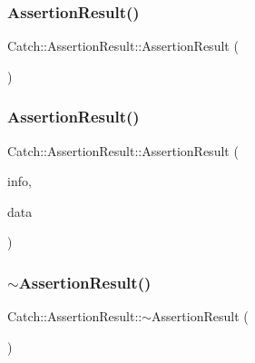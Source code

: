 \subsubsection{\texorpdfstring{Assertion\+Result()}{AssertionResult()}\hspace{0.1cm}{\footnotesize\ttfamily [1/2]}}
{\footnotesize\ttfamily Catch\+::\+Assertion\+Result\+::\+Assertion\+Result (\begin{DoxyParamCaption}{ }\end{DoxyParamCaption})}

\mbox{\label{class_catch_1_1_assertion_result_ab58aeec27052ba400633ed0e36cea692}} 
\subsubsection{\texorpdfstring{Assertion\+Result()}{AssertionResult()}\hspace{0.1cm}{\footnotesize\ttfamily [2/2]}}
{\footnotesize\ttfamily Catch\+::\+Assertion\+Result\+::\+Assertion\+Result (\begin{DoxyParamCaption}\item[{\mbox{\hyperlink{struct_catch_1_1_assertion_info}{Assertion\+Info}} const \&}]{info,  }\item[{\mbox{\hyperlink{struct_catch_1_1_assertion_result_data}{Assertion\+Result\+Data}} const \&}]{data }\end{DoxyParamCaption})}

\mbox{\label{class_catch_1_1_assertion_result_abf90f5abd04d38b2fb4f5d575bdc4f1e}} 
\subsubsection{\texorpdfstring{$\sim$\+Assertion\+Result()}{~AssertionResult()}}
{\footnotesize\ttfamily Catch\+::\+Assertion\+Result\+::$\sim$\+Assertion\+Result (\begin{DoxyParamCaption}{ }\end{DoxyParamCaption})}



